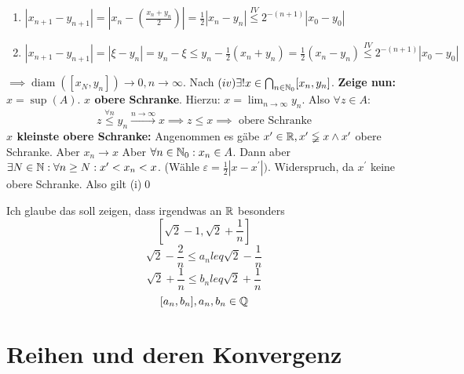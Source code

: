 \documentclass[consecutivenumbering]{gadsescript}
\begin{document}
\begin{subtheorem}
\begin{subproof-headless}
\begin{description}
\begin{itemize}
\begin{description}
\begin{enumerate}[label=(\alph*)]
									\item $ | x_{n+1} - y_{n+1} | = \left| x_n - \left( \frac{x_n + y_n}{2} \right) \right| = \frac{1}{2} | x_n - y_n | \overset{IV}{\leq} 2^{-(n+1)} |x_0 - y_0| $
									\item $ | x_{n+1} - y_{n+1} | = | \xi - y_n | = y_n - \xi \leq y_n - \frac{1}{2} (x_n + y_n) = \frac{1}{2} (x_n - y_n) \overset{IV}{\leq} 2^{-(n+1)} | x_0 - y_0 | $
								\end{enumerate}
						\end{description}
						$ \implies \operatorname{diam}([x_N, y_n]) \to 0, n \to \infty $. Nach $ (iv) \exists! x \in \bigcap_{n \in \mathbb{N}_0}[x_n, y_n] $. \textbf{Zeige nun:} $ x = \sup(A) $. \textbf{$x$ obere Schranke}. Hierzu: $ x = \lim_{n\to\infty} y_n $. Also $ \forall z \in A $:
						\[ z \overset{\forall n}{\leq} y_n \overset{n\to\infty}{\to} x \implies z \leq x \implies \text{ obere Schranke} \]
						\textbf{$x$ kleinste obere Schranke:} Angenommen es gäbe $ x^\prime \in \mathbb{R}, x^\prime \lneqq x \wedge x^\prime$ obere Schranke. Aber $ x_n \to x $ Aber $ \forall n \in \mathbb{N}_0 : x_n \in A$. Dann aber $ \exists N \in \mathbb{N} : \forall n \geq N : x^\prime < x_n < x $. (Wähle $ \varepsilon = \frac{1}{2} | x - x^\prime|) $. Widerspruch, da $ x^\prime $ keine obere Schranke. Also gilt (i)\qed
				\end{itemize}
		\end{description}
	\end{subproof-headless}
\end{subtheorem}

\begin{subexample*}
	Ich glaube das soll zeigen, dass irgendwas an $ \mathbb{R} $ besonders
	\[ [ \sqrt{2} - 1, \sqrt{2} + \frac{1}{n} ] \]
	\[ \sqrt{2} - \frac{2}{n} \leq a_n leq \sqrt{2} - \frac{1}{n} \]
	\[ \sqrt{2} + \frac{1}{n} \leq b_n leq \sqrt{2} + \frac{1}{n} \]
	\[ [ a_n, b_n ], a_n, b_n \in \mathbb{Q} \]
\end{subexample*}

\section{Reihen und deren Konvergenz}
\end{document}
